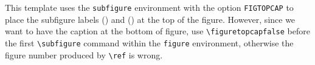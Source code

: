 %
%
%
%
%
%
This template uses the \texttt{subfigure} environment with the option
\texttt{FIGTOPCAP} to place the subfigure labels () and
() at the top of the figure. However, since we want to have the
caption at the bottom of figure, use \verb|\figuretopcapfalse|
before the first \verb|\subfigure| command within the \texttt{figure}
environment, otherwise the figure number produced by \verb|\ref| is wrong.
%
%
%
%
